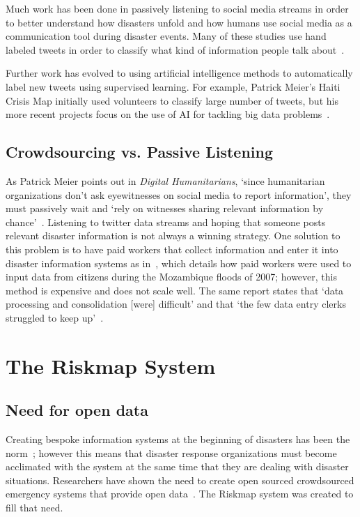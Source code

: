 Much work has been done in passively listening to social media streams in order
to better understand how disasters unfold and how humans use social media as a
communication tool during disaster events. Many of these studies use hand
labeled tweets in order to classify what kind of information people talk
about~\cite{alamTwitterTaleThree2018}.

Further work has evolved to using artificial intelligence methods to
automatically label new tweets using supervised learning. For example, Patrick
Meier's Haiti Crisis Map initially used volunteers to classify large number of
tweets, but his more recent projects focus on the use of AI for tackling big
data problems~\cite{meierDigitalHumanitariansHow2015}.
\subsection{Crowdsourcing vs. Passive Listening} 
As Patrick Meier points out in \textit{Digital Humanitarians}, `since
humanitarian organizations don't ask eyewitnesses on social media to report
information', they must passively wait and `rely on witnesses sharing relevant
information by chance'~\cite{meierDigitalHumanitariansHow2015}. Listening to
twitter data streams and hoping that someone posts relevant disaster information
is not always a winning strategy. One solution to this problem is to have paid
workers that collect information and enter it into disaster information systems
as in~\cite{aminDataNaturalDisasters2008}, which details how paid workers were
used to input data from citizens during the Mozambique floods of 2007; however,
this method is expensive and does not scale well. The same report states that
`data processing and consolidation [were] difficult' and that `the few data
entry clerks struggled to keep up'~\cite{aminDataNaturalDisasters2008}.

\section{The Riskmap System}\label{chap1:riskmap}

  \subsection{Need for open data} Creating bespoke information systems at
  the beginning of disasters has been the
  norm~\cite{aminDataNaturalDisasters2008}; however this means that
  disaster response organizations must become acclimated with the system
  at the same time that they are dealing with disaster situations.
  Researchers have shown the need to create open sourced crowdsourced
  emergency systems that provide open
  data~\cite{avvenutiNeedOpeningCrowdsourced2018a}. The Riskmap system was
  created to fill that need.
  

